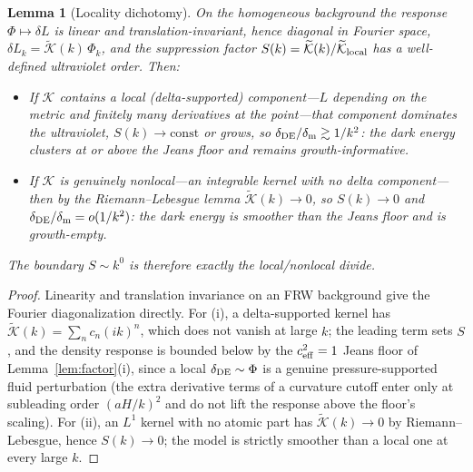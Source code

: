 \documentclass[twocolumn,10pt]{article}
\newtheorem{lemma}{Lemma}
\newcommand{\dDE}{\delta_{\rm DE}}
\newcommand{\dm}{\delta_{\rm m}}
\begin{document}
\begin{lemma}[Locality dichotomy]
\label{lem:kernels}
On the homogeneous background the response $\Phi\mapsto\delta L$ is linear and
translation-invariant, hence diagonal in Fourier space,
$\delta L_k=\widetilde{\mathcal K}(k)\,\Phi_k$, and the suppression factor
$S(k)=\widetilde{\mathcal K}(k)/\widetilde{\mathcal K}_{\rm local}$ has a
well-defined ultraviolet order. Then:
\begin{itemize}
\item[(i)] If $\mathcal K$ contains a local (delta-supported) component---$L$
depending on the metric and finitely many derivatives at the point---that
component dominates the ultraviolet, $S(k)\!\to\!\mathrm{const}$ or grows, so
$\dDE/\dm\gtrsim1/k^{2}$: the dark energy clusters at or above the Jeans floor
and remains growth-informative.
\item[(ii)] If $\mathcal K$ is genuinely nonlocal---an integrable kernel with no
delta component---then by the Riemann--Lebesgue lemma
$\widetilde{\mathcal K}(k)\!\to\!0$, so $S(k)\!\to\!0$ and
$\dDE/\dm=o(1/k^{2})$: the dark energy is smoother than the Jeans floor and is
growth-empty.
\end{itemize}
The boundary $S\sim k^0$ is therefore exactly the local/nonlocal divide.
\end{lemma}

\begin{proof}
Linearity and translation invariance on an FRW background give the Fourier
diagonalization directly. For (i), a delta-supported kernel has
$\widetilde{\mathcal K}(k)=\sum_n c_n(ik)^n$, which does not vanish at large $k$;
the leading term sets $S$, and the density response is bounded below by the
$c_{\rm eff}^2=1$ Jeans floor of Lemma~\ref{lem:factor}(i), since a local
$\dDE\sim\Phi$ is a genuine pressure-supported fluid perturbation (the extra
derivative terms of a curvature cutoff enter only at subleading order
$(aH/k)^2$ and do not lift the response above the floor's scaling). For (ii),
an $L^1$ kernel with no atomic part has $\widetilde{\mathcal K}(k)\to0$ by
Riemann--Lebesgue, hence $S(k)\to0$; the model is strictly smoother than a
local one at every large $k$.
\end{proof}
\end{document}
